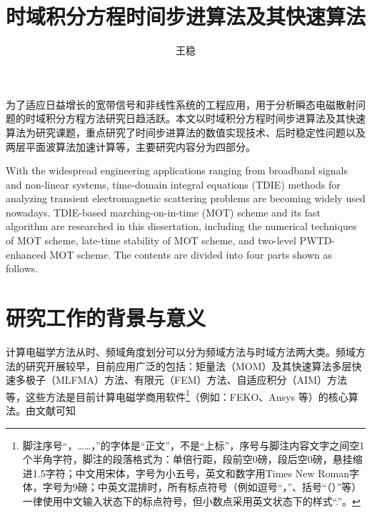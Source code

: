 \documentclass[promaster]{thesis-uestc}
\title{时域积分方程时间步进算法及其快速算法}{The Time Marching Scheme of Time Domain
    Integral Equation and Corresponding Fast Algorithm}
\author{王稳}{Wang Wen}
\begin{document}
\makecover

\originalitydeclaration

\begin{chineseabstract}
为了适应日益增长的宽带信号和非线性系统的工程应用，用于分析瞬态电磁散射问题的时域积分方程方法研究日趋活跃。本文以时域积分方程时间步进算法及其快速算法为研究课题，重点研究了时间步进算法的数值实现技术、后时稳定性问题以及两层平面波算法加速计算等，主要研究内容分为四部分。

\end{chineseabstract}

\begin{englishabstract}
With the widespread engineering applications ranging from broadband signals and non-linear systems, time-domain integral equations (TDIE) methods for analyzing transient electromagnetic scattering problems are becoming widely used nowadays. TDIE-based marching-on-in-time (MOT) scheme and its fast algorithm are researched in this dissertation, including the numerical techniques of MOT scheme, late-time stability of MOT scheme, and two-level PWTD-enhanced MOT scheme. The contents are divided into four parts shown as follows.

\end{englishabstract}

\thesistableofcontents

\thesischapterexordium

\section{研究工作的背景与意义}

计算电磁学方法从时、频域角度划分可以分为频域方法与时域方法两大类。频域方法的研究开展较早，目前应用广泛的包括：矩量法（MOM）及其快速算法多层快速多极子（MLFMA）方法、有限元（FEM）方法、自适应积分（AIM）方法等，这些方法是目前计算电磁学商用软件\footnote{脚注序号“，……，”的字体是“正文”，不是“上标”，序号与脚注内容文字之间空1个半角字符，脚注的段落格式为：单倍行距，段前空0磅，段后空0磅，悬挂缩进1.5字符；中文用宋体，字号为小五号，英文和数字用Times New Roman字体，字号为9磅；中英文混排时，所有标点符号（例如逗号“，”、括号“（）”等）一律使用中文输入状态下的标点符号，但小数点采用英文状态下的样式“.”。}（例如：FEKO、Ansys 等）的核心算法。由文献\cite{feng997he,clerc2010discrete,xiao2012yi}可知
\end{document}
